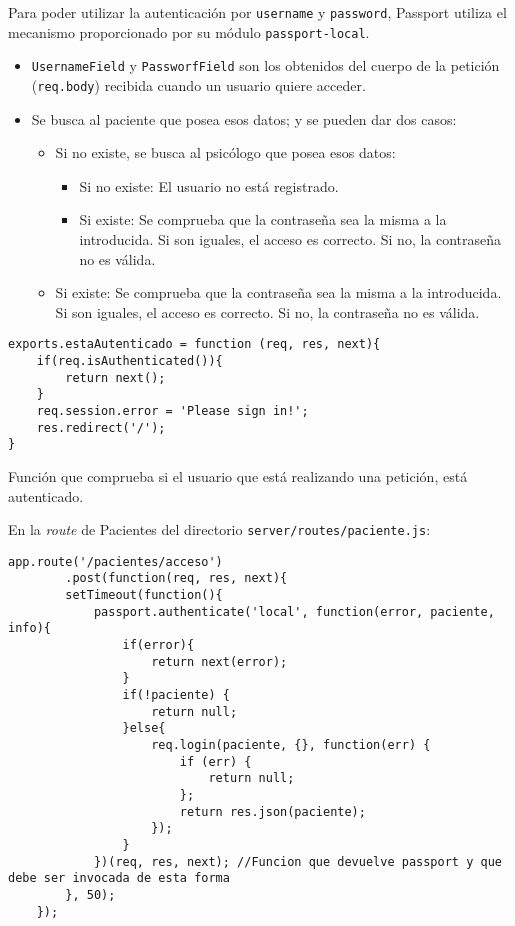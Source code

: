 Para poder utilizar la autenticación por \texttt{username}  y \texttt{password}, Passport utiliza el mecanismo proporcionado por su módulo \texttt{passport-local}. 
\begin{itemize}
\item \texttt{UsernameField} y \texttt{PassworfField} son los obtenidos del cuerpo de la petición (\texttt{req.body}) recibida cuando un usuario quiere acceder.
\item Se busca al paciente que posea esos datos; y se pueden dar dos casos:
\begin{itemize}
\item Si no existe, se busca al psicólogo que posea esos datos:
\begin{itemize}
\item Si no existe: El usuario no está registrado.
\item Si existe: Se comprueba que la contraseña sea la misma a la introducida. Si son iguales, el acceso es correcto. Si no, la contraseña no es válida.
\end{itemize}
\item Si existe: Se comprueba que la contraseña sea la misma a la introducida. Si son iguales, el acceso es correcto. Si no, la contraseña no es válida.
\end{itemize}
\end{itemize}


\medskip
\begin{lstlisting}
exports.estaAutenticado = function (req, res, next){
	if(req.isAuthenticated()){
		return next();
	}
	req.session.error = 'Please sign in!';
	res.redirect('/');
}
\end{lstlisting}


Función que comprueba si el usuario que está realizando una petición, está autenticado.


En la \textit{route} de Pacientes del directorio \texttt{server/routes/paciente.js}:


\medskip
\begin{lstlisting}
app.route('/pacientes/acceso')
		.post(function(req, res, next){
		setTimeout(function(){
			passport.authenticate('local', function(error, paciente, info){
				if(error){
					return next(error);
				}
				if(!paciente) {
					return null;
				}else{
					req.login(paciente, {}, function(err) {
						if (err) { 
							return null;
						};
						return res.json(paciente);
					});
				}
			})(req, res, next); //Funcion que devuelve passport y que debe ser invocada de esta forma
		}, 50);
	});
\end{lstlisting}


